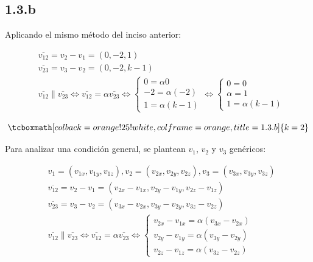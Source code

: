 \documentclass{article}
\begin{document}
\subsection*{1.3.b}
\label{subsec:1.3.b}

Aplicando el mismo método del inciso anterior:

\begin{subequations}
\begin{align}
& \overline{v_{12}} = v_2 - v_1 = (0, -2, 1) \\
& \overline{v_{23}} = v_3 - v_2 = (0, -2, k-1) \\
& \overline{v_{12}} \parallel \overline{v_{23}} \Leftrightarrow \overline{v_{12}} = \alpha \overline{v_{23}} \Leftrightarrow \left\{ \begin{array}{ll}
0 = \alpha 0 \\
-2 = \alpha (-2) \\
1 = \alpha (k-1)
\end{array} \right. \Leftrightarrow \left\{ \begin{array}{ll}
0 = 0 \\
\alpha = 1 \\
1 = \alpha (k-1)
\end{array} \right.
\end{align}
\end{subequations}

\begin{equation}
\tcboxmath[colback=orange!25!white,colframe=orange,title=1.3.b]
{ k = 2 }
\end{equation}

Para analizar una condición general, se plantean $v_1$, $v_2$ y $v_3$ genéricos:

\begin{subequations}
\begin{align}
& v_1 = (v_{1x}, v_{1y}, v_{1z}), v_2 = (v_{2x}, v_{2y}, v_{2z}), v_3 = (v_{3x}, v_{3y}, v_{3z}) \\
& \overline{v_{12}} = v_2 - v_1 = (v_{2x} - v_{1x}, v_{2y} - v_{1y}, v_{2z} - v_{1z}) \\
& \overline{v_{23}} = v_3 - v_2 = (v_{3x} - v_{2x}, v_{3y} - v_{2y}, v_{3z} - v_{2z}) \\
& \overline{v_{12}} \parallel \overline{v_{23}} \Leftrightarrow \overline{v_{12}} = \alpha \overline{v_{23}} \Leftrightarrow \left\{ \begin{array}{ll}
v_{2x} - v_{1x} = \alpha (v_{3x} - v_{2x}) \\
v_{2y} - v_{1y} = \alpha (v_{3y} - v_{2y}) \\
v_{2z} - v_{1z} = \alpha (v_{3z} - v_{2z})
\end{array} \right.
\end{align}
\end{subequations}
\end{document}
